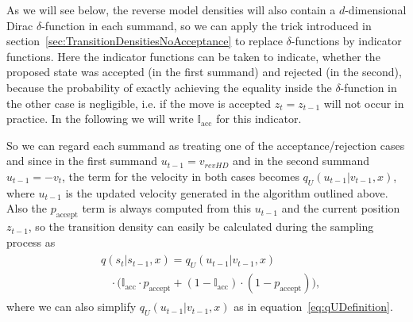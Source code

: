 As we will see below, the reverse model densities will also contain a $d$-dimensional Dirac $\delta$-function in each summand, so we can apply the trick introduced in section~\ref{sec:TransitionDensitiesNoAcceptance} to replace $\delta$-functions by indicator functions. Here the indicator functions can be taken to indicate, whether the proposed state was accepted (in the first summand) and rejected (in the second), because the probability of exactly achieving the equality inside the $\delta$-function in the other case is negligible, i.e. if the move is accepted $z_t = z_{t-1}$ will not occur in practice. In the following we will write $\mathbb{I}_\textrm{acc}$ for this indicator.

So we can regard each summand as treating one of the acceptance/rejection cases and since in the first summand $u_{t-1} = v_{revHD}$ and in the second summand $u_{t-1} = -v_t$, the term for the velocity in both cases becomes $q_U(u_{t-1}|v_{t-1}, x)$, where $u_{t-1}$ is the updated velocity generated in the algorithm outlined above. Also the $p_\textrm{accept}$ term is always computed from this $u_{t-1}$ and the current position $z_{t-1}$, so the transition density can easily be calculated during the sampling process as
\begin{align}
\begin{split}
&q(s_t|s_{t-1}, x) = q_U(u_{t-1}|v_{t-1}, x) \\
&\;\;\;\cdot \Big( \mathbb{I}_\textrm{acc} \cdot p_{\textrm{accept}} + (1 - \mathbb{I}_\textrm{acc}) \cdot (1- p_{\textrm{accept}}) \Big),
\end{split}
\end{align}
where we can also simplify $q_U(u_{t-1}|v_{t-1}, x)$ as in equation~\eqref{eq:qUDefinition}.

